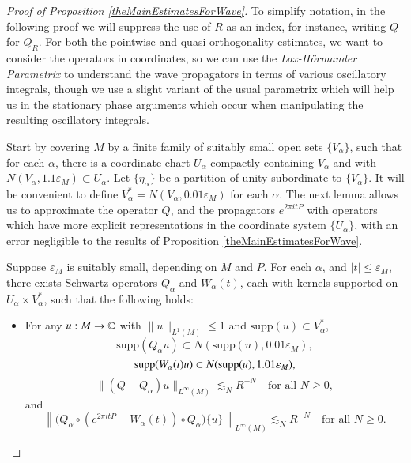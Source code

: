 \begin{proof}[Proof of Proposition \ref{theMainEstimatesForWave}]

To simplify notation, in the following proof we will suppress the use of $R$ as an index, for instance, writing $Q$ for $Q_R$. For both the pointwise and quasi-orthogonality estimates, we want to consider the operators in coordinates, so we can use the \emph{Lax-H\"{o}rmander Parametrix} to understand the wave propagators in terms of various oscillatory integrals, though we use a slight variant of the usual parametrix which will help us in the stationary phase arguments which occur when manipulating the resulting oscillatory integrals.

Start by covering $M$ by a finite family of suitably small open sets $\{ V_\alpha \}$, such that for each $\alpha$, there is a coordinate chart $U_\alpha$ compactly containing $V_\alpha$ and with $N(V_\alpha, 1.1 \varepsilon_M) \subset U_\alpha$. Let $\{ \eta_\alpha \}$ be a partition of unity subordinate to $\{ V_\alpha \}$. It will be convenient to define $V_\alpha^* = N(V_\alpha, 0.01 \varepsilon_M )$ for each $\alpha$. The next lemma allows us to approximate the operator $Q$, and the propagators $e^{2\pi i t P}$ with operators which have more explicit representations in the coordinate system $\{ U_\alpha \}$, with an error negligible to the results of Proposition \ref{theMainEstimatesForWave}.


\pagebreak[3]

\begin{lemma} \label{pseudodifferentialCoordinateLemma}
    Suppose $\varepsilon_M$ is suitably small, depending on $M$ and $P$. For each $\alpha$, and $|t| \leq \varepsilon_M$, there exists Schwartz operators $Q_\alpha$ and $W_\alpha(t)$, each with kernels supported on $U_\alpha \times V^*_\alpha$, such that the following holds:
    \begin{itemize}%
    \setlength\itemsep{0.5em}
        \item For any $u: M \to \operatorname{\mathbb{C}}$ with $\| u \|_{L^1(M)} \leq 1$ and $\text{supp}(u) \subset V_\alpha^*$,
        \begin{equation}
            \text{supp}(Q_{\alpha} u) \subset N(\text{supp}(u), 0.01 \varepsilon_M),
        \end{equation}
        \begin{equation}
            \operatorname{\text{supp}}(W_{\alpha}(t) u) \subset N(\operatorname{\text{supp}}(u), 1.01 \varepsilon_M ),
        \end{equation}
        \begin{equation}
            \| (Q - Q_{\alpha}) u \|_{L^\infty(M)} \lesssim_N R^{-N} \quad\text{for all $N \geq 0$},
        \end{equation}
        and
        \begin{equation}
            \left\| \big( Q_{\alpha} \circ ( e^{2 \pi i t P} - W_{\alpha}(t) ) \circ Q_{\alpha} \big) \{ u \} \right\|_{L^\infty(M)} \lesssim_N R^{-N} \quad\text{for all $N \geq 0$}.
        \end{equation}


\end{itemize}
\end{lemma}
\end{proof}
